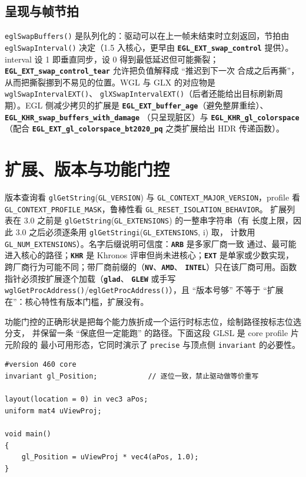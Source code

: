\documentclass[12pt,a4paper,fontset=fandol]{ctexbook}
\newcommand{\Fn}[1]{\texttt{#1()}}
\newcommand{\Tp}[1]{\texttt{#1}}
\newcommand{\Bk}{\discretionary{}{}{}}
\newcommand{\Lib}[1]{\textbf{\texttt{#1}}}
\newcommand{\Lang}[1]{\textsf{#1}}
\newcommand{\GSL}{\Lang{GLSL}}
\begin{document}
\subsection{呈现与帧节拍}

\Fn{eglSwapBuffers} 是队列化的：驱动可以在上一帧未结束时立刻返回，节拍由
\Fn{eglSwapInterval} 决定（1.5 入核心，更早由 \Lib{EGL\_EXT\_swap\_control}
提供）。interval 设 1 即垂直同步，设 0 得到最低延迟但可能撕裂；
\Lib{EGL\_EXT\_swap\_control\_tear} 允许把负值解释成 ``推迟到下一次
合成之后再撕''，从而把撕裂挪到不易见的位置。WGL 与 GLX 的对应物是
\Fn{wglSwapIntervalEXT}、
\Fn{glXSwapIntervalEXT}（后者还能给出目标刷新周期）。EGL 侧减少拷贝的扩展是
\Lib{EGL\_EXT\_buffer\_age}（避免整屏重绘）、\Lib{EGL\_KHR\_swap\_buffers\_with\_damage}
（只呈现脏区）与 \Lib{EGL\_KHR\_gl\_colorspace}（配合
\Lib{EGL\_EXT\_gl\_colorspace\_bt2020\_pq} 之类扩展给出 HDR 传递函数）。

\section{扩展、版本与功能门控}

版本查询看 \Tp{glGetString}(\Tp{GL\_VERSION}) 与
\Tp{GL\_CONTEXT\_MAJOR\_VERSION}，profile 看
\Tp{GL\_CONTEXT\_PROFILE\_MASK}，鲁棒性看 \Tp{GL\_RESET\_ISOLATION\_BEHAVIOR}。
扩展列表在 3.0 之前是 \Tp{glGetString}(\Tp{GL\_EXTENSIONS}) 的一整串字符串（有
长度上限，因此 3.0 之后必须逐条用 \Tp{glGetStringi}(\Tp{GL\_EXTENSIONS}, i) 取，
计数用 \Tp{GL\_NUM\_EXTENSIONS}）。名字后缀说明可信度：\Lib{ARB} 是多家厂商一致
通过、最可能进入核心的路径；\Lib{KHR} 是 Khronos 评审但尚未进核心；\Lib{EXT}
是单家或少数实现，跨厂商行为可能不同；带厂商前缀的（\Lib{NV}、\Lib{AMD}、
\Lib{INTEL}）只在该厂商可用。函数指针必须按扩展逐个加载（\Lib{glad}、
\Lib{GLEW} 或手写 \Fn{wglGetProcAddress}/{\Bk}\Fn{eglGetProcAddress}），且
``版本号够'' 不等于 ``扩展在''：核心特性有版本门槛，扩展没有。

功能门控的正确形状是把每个能力族折成一个运行时标志位，绘制路径按标志位选分支，
并保留一条 ``保底但一定能跑'' 的路径。下面这段 \GSL{} 是 core profile 片元阶段的
最小可用形态，它同时演示了 \Tp{precise} 与顶点侧 \Tp{invariant} 的必要性。

\begin{lstlisting}[style=glslstyle,caption={顶点侧重声明 gl\_Position 为 invariant：两次不同 pass 的同一顶点必须落到同一像素网格},label={lst:ch11-invariant}]
#version 460 core
invariant gl_Position;            // 逐位一致，禁止驱动做等价重写

layout(location = 0) in vec3 aPos;
uniform mat4 uViewProj;

void main()
{
    gl_Position = uViewProj * vec4(aPos, 1.0);
}
\end{lstlisting}
\end{document}
